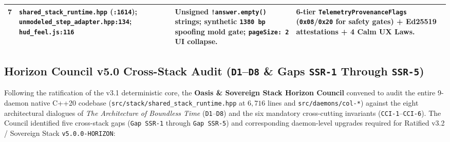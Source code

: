 \begin{table}[htbp]
{\begin{tabular}{@{}cp{3.6cm}p{4.1cm}p{4.6cm}@{}}
\addlinespace[3pt]
\textbf{7} & \texttt{shared\_stack\_runtime.hpp} (\texttt{:1614}); \texttt{unmodeled\_step\_adapter.hpp:134}; \texttt{hud\_feel.js:116} & Unsigned \texttt{!answer.empty()} strings; synthetic \texttt{1380 bp} spoofing mold gate; \texttt{pageSize: 2} UI collapse. & 6-tier \texttt{TelemetryProvenanceFlags} (\texttt{0x08}/\texttt{0x20} for safety gates) + Ed25519 attestations + 4 Calm UX Laws. \\
\bottomrule
\end{tabular}%
}
\end{table}

\subsection{Horizon Council v5.0 Cross-Stack Audit (\texttt{D1}--\texttt{D8} \& Gaps \texttt{SSR-1} Through \texttt{SSR-5})}
\label{sec:horizon-v50-cross-stack-audit}

Following the ratification of the v3.1 deterministic core, the \textbf{Oasis \& Sovereign Stack Horizon Council} convened to audit the entire 9-daemon native C++20 codebase (\texttt{src/stack/shared\_stack\_runtime.hpp} at $6{,}716$ lines and \texttt{src/daemons/col-*}) against the eight architectural dialogues of \emph{The Architecture of Boundless Time} (\texttt{D1}--\texttt{D8}) and the six mandatory cross-cutting invariants (\texttt{CCI-1}--\texttt{CCI-6}). The Council identified five cross-stack gaps (\texttt{Gap SSR-1} through \texttt{Gap SSR-5}) and corresponding daemon-level upgrades required for Ratified v3.2 / Sovereign Stack \texttt{v5.0.0-HORIZON}:

